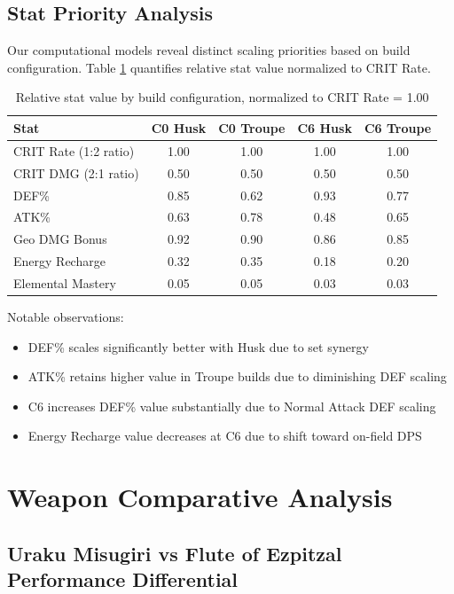 \documentclass[12pt,a4paper]{article}
\begin{document}
\subsection{Stat Priority Analysis}

Our computational models reveal distinct scaling priorities based on build configuration. Table \ref{tab:stat_priority} quantifies relative stat value normalized to CRIT Rate.

\begin{table}[h]
\centering
\begin{tabular}{lcccc}
\toprule
\textbf{Stat} & \textbf{C0 Husk} & \textbf{C0 Troupe} & \textbf{C6 Husk} & \textbf{C6 Troupe} \\
\midrule
CRIT Rate (1:2 ratio) & 1.00 & 1.00 & 1.00 & 1.00 \\
CRIT DMG (2:1 ratio) & 0.50 & 0.50 & 0.50 & 0.50 \\
DEF\% & 0.85 & 0.62 & 0.93 & 0.77 \\
ATK\% & 0.63 & 0.78 & 0.48 & 0.65 \\
Geo DMG Bonus & 0.92 & 0.90 & 0.86 & 0.85 \\
Energy Recharge & 0.32 & 0.35 & 0.18 & 0.20 \\
Elemental Mastery & 0.05 & 0.05 & 0.03 & 0.03 \\
\bottomrule
\end{tabular}
\caption{Relative stat value by build configuration, normalized to CRIT Rate = 1.00}
\label{tab:stat_priority}
\end{table}

Notable observations:
\begin{itemize}
    \item DEF\% scales significantly better with Husk due to set synergy
    \item ATK\% retains higher value in Troupe builds due to diminishing DEF scaling
    \item C6 increases DEF\% value substantially due to Normal Attack DEF scaling
    \item Energy Recharge value decreases at C6 due to shift toward on-field DPS
\end{itemize}

\section{Weapon Comparative Analysis}

\subsection{Uraku Misugiri vs Flute of Ezpitzal Performance Differential}
\end{document}
